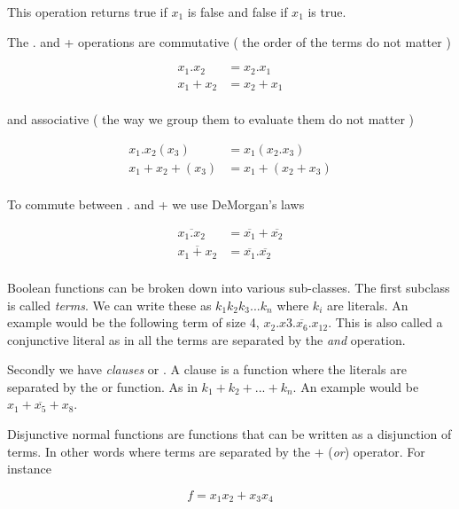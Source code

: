 \documentclass[10pt,a4paper]{article}
\begin{document}
This operation returns true if $x_1$ is false and false if $x_1$ is true.

The . and + operations are commutative ( the order of the terms do not matter )

\begin{equation}
\begin{split}
x_1.x_2 &= x_2.x_1 \\
x_1+x_2 &= x_2 + x_1 \\
\end{split}
\end{equation}

and associative ( the way we group them to evaluate them do not matter )

\begin{equation}
\begin{split}
x_1.x_2(x_3) &= x_1(x_2.x_3) \\
x_1 + x_2 + ( x_3 ) &= x_1 + ( x_2 + x_3 ) \\
\end{split}
\end{equation}

To commute between . and + we use DeMorgan's laws

\begin{equation}
\begin{split}
\overline{x_1.x_2} &= \overline{x_1} + \overline{x_2} \\
\overline{x_1 + x_2} &= \overline{x_1}.\overline{x_2} \\
\end{split}
\end{equation}

Boolean functions can be broken down into various sub-classes. The first subclass is called \emph{terms}. We can write these as $k_1k_2k_3...k_n$ where $k_i$ are literals. An example would be the following term of size 4, $x_2.x3.\overline{x_6}.x_{12}$. This is also called a conjunctive literal as in all the terms are separated by the \emph{and} operation.

Secondly we have \emph{clauses} or . A clause is a function where the literals are separated by the or function. As in $k_1+k_2 + ... + k_n $. An example would be $x_1 + \overline{x_5} + x_8$.

Disjunctive normal functions are functions that can be written as a disjunction of terms. In other words where terms are separated by the $+$ (\emph{or}) operator. For instance 

\begin{equation}
f= x_1x_2 + x_3x_4
\end{equation}
\end{document}
